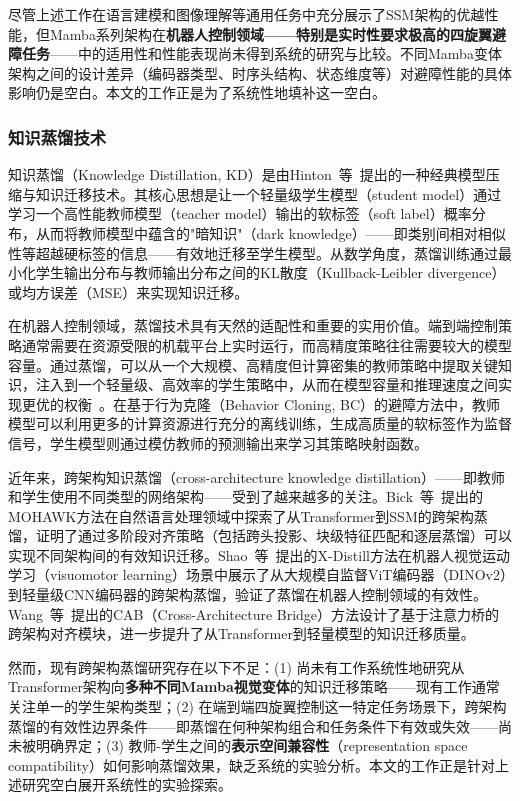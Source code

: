 \documentclass[12pt,a4paper]{article}
\numberwithin{equation}{section}
\numberwithin{figure}{section}
\numberwithin{table}{section}
\begin{document}
尽管上述工作在语言建模和图像理解等通用任务中充分展示了SSM架构的优越性能，但Mamba系列架构在\textbf{机器人控制领域——特别是实时性要求极高的四旋翼避障任务}——中的适用性和性能表现尚未得到系统的研究与比较。不同Mamba变体架构之间的设计差异（编码器类型、时序头结构、状态维度等）对避障性能的具体影响仍是空白。本文的工作正是为了系统性地填补这一空白。

\subsubsection{知识蒸馏技术}

知识蒸馏（Knowledge Distillation, KD）是由Hinton~等~\cite{hinton2015distilling}提出的一种经典模型压缩与知识迁移技术。其核心思想是让一个轻量级学生模型（student model）通过学习一个高性能教师模型（teacher model）输出的软标签（soft label）概率分布，从而将教师模型中蕴含的"暗知识"（dark knowledge）——即类别间相对相似性等超越硬标签的信息——有效地迁移至学生模型。从数学角度，蒸馏训练通过最小化学生输出分布与教师输出分布之间的KL散度（Kullback-Leibler divergence）或均方误差（MSE）来实现知识迁移。

在机器人控制领域，蒸馏技术具有天然的适配性和重要的实用价值。端到端控制策略通常需要在资源受限的机载平台上实时运行，而高精度策略往往需要较大的模型容量。通过蒸馏，可以从一个大规模、高精度但计算密集的教师策略中提取关键知识，注入到一个轻量级、高效率的学生策略中，从而在模型容量和推理速度之间实现更优的权衡~\cite{chen2020distilling}。在基于行为克隆（Behavior Cloning, BC）的避障方法中，教师模型可以利用更多的计算资源进行充分的离线训练，生成高质量的软标签作为监督信号，学生模型则通过模仿教师的预测输出来学习其策略映射函数。

近年来，跨架构知识蒸馏（cross-architecture knowledge distillation）——即教师和学生使用不同类型的网络架构——受到了越来越多的关注。Bick~等~\cite{bick2024mohawk}提出的MOHAWK方法在自然语言处理领域中探索了从Transformer到SSM的跨架构蒸馏，证明了通过多阶段对齐策略（包括跨头投影、块级特征匹配和逐层蒸馏）可以实现不同架构间的有效知识迁移。Shao~等~\cite{shao2025xdistill}提出的X-Distill方法在机器人视觉运动学习（visuomotor learning）场景中展示了从大规模自监督ViT编码器（DINOv2）到轻量级CNN编码器的跨架构蒸馏，验证了蒸馏在机器人控制领域的有效性。Wang~等~\cite{wang2025cab}提出的CAB（Cross-Architecture Bridge）方法设计了基于注意力桥的跨架构对齐模块，进一步提升了从Transformer到轻量模型的知识迁移质量。

然而，现有跨架构蒸馏研究存在以下不足：(1) 尚未有工作系统性地研究从Transformer架构向\textbf{多种不同Mamba视觉变体}的知识迁移策略——现有工作通常关注单一的学生架构类型；(2) 在端到端四旋翼控制这一特定任务场景下，跨架构蒸馏的有效性边界条件——即蒸馏在何种架构组合和任务条件下有效或失效——尚未被明确界定；(3) 教师-学生之间的\textbf{表示空间兼容性}（representation space compatibility）如何影响蒸馏效果，缺乏系统的实验分析。本文的工作正是针对上述研究空白展开系统性的实验探索。
\end{document}
